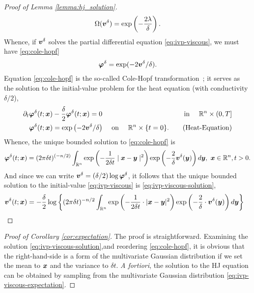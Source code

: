 \begin{proof}[Proof of Lemma \ref{lemma:hj_solution}]
\begin{align}
 	\Omega(\bm{v}^\delta) = \exp\left(-\frac{2 \lambda}{\delta}\right). 
 	\label{eq:linear_trans}
 \end{align}
%
 Whence, if $\bm{v}^\delta$ solves the partial differential equation \eqref{eq:ivp-viscous}, we must have \eqref{eq:cole-hopf} \ie 
%
\begin{align}
	\bm{\varphi}^\delta = \exp(-2\bm{v}^\delta/\delta).
\end{align}
Equation \eqref{eq:cole-hopf} is the so-called Cole-Hopf transformation~\citet[\S 4.4.1]{EvansPDEBook}; it serves as the solution to the initial-value problem for the heat equation (with conductivity $\delta/2$), 
%
\begin{align}
	\partial_t \colehopf^\delta(t; \state) &- \dfrac{\delta}{2} \colehopf^\delta(t; \state) = 0  &\text{ in } \quad \ren \times (0, T] \nonumber \\
	\colehopf^\delta(t; \state) &= \exp\left({-2\valuefunc^\delta}/{\delta}\right)  & \text{ on } \quad \ren \times \{t=0\}. %
	\label{eq:Heat-Equation}
	\tag{Heat-Equation}
\end{align}
%
Whence, the unique bounded solution to \eqref{eq:cole-hopf} is
%
\begin{align}
\bm{\varphi}^\delta(t; \bm{x}) = (2 \pi \delta t )^{(-n/2)} \int_{\mathbb{R}^n} \exp \left(-\frac{1}{2 \delta t} \mid \bm{x} - \bm{y} \mid^2\right) \exp \left(-\frac{2}{\delta}\bm{v}^\delta(\bm{y})\right) d\bm{y}, \,\, \bm{x} \in \mathbb{R}^n, t > 0. 
\end{align} 
%
And since we can write $\bm{v}^\delta = (\delta/2) \log \bm{\varphi}^\delta$, it follows that the unique bounded solution to the initial-value \eqref{eq:ivp-viscous} is \eqref{eq:ivp-viscous-solution},\ie 
%
\begin{align}
	\bm{v}^\delta(t; \bm{x}) &= -\frac{\delta}{2} \log \bigg\{(2\pi\delta t)^{-n/2}\int_{\mathbb{R}^n} \exp \left(-\frac{1}{2\delta t}\cdot |\bm{x}-\bm{y}|^2\right) \exp \left(-\frac{2}{\delta}\cdot \bm{v}^\delta(\bm{y})\right) d\bm{y} \bigg\}
\end{align}
%
\end{proof}


\begin{proof}[Proof of Corollary \ref{cor:expectation}]
	The proof is straightforward. Examining the solution \eqref{eq:ivp-viscous-solution},and reordering \eqref{eq:cole-hopf}, it is obvious that the right-hand-side is a form of the multivariate Gaussian distribution if we set the mean to $\bm{x}$ and the variance to $\delta t$. \textit{A fortiori}, the solution to the HJ equation can be obtained by sampling from the multivariate Gaussian distribution \eqref{eq:ivp-viscous-expectation}.
\end{proof}

